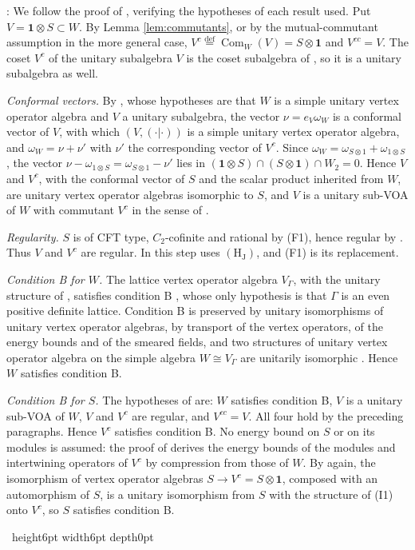 \documentclass[leqno]{article}
\newcommand{\qed}{\hfill \vrule height6pt  width6pt depth0pt}
\newcommand{\ot}{\otimes}
\newcommand{\ov}{\overset}
\newenvironment{proof}[1][]{\noindent {\it Proof #1} : }{\hbox{~}\qed
\smallskip
}
\numberwithin{equation}{section}
\begin{document}
\begin{proof}
We follow the proof of \cite[Theorem 7.17]{ArhII}, verifying the hypotheses of each result used. Put $V = \mathbf 1 \ot S \subset W$. By Lemma \ref{lem:commutants}, or by the mutual-commutant assumption in the more general case, $V^c \ov{\mathrm{def}}{=} \operatorname{Com}_W(V) = S \ot \mathbf 1$ and $V^{cc} = V$. The coset $V^c$ of the unitary subalgebra $V$ is the coset subalgebra of \cite[Example 5.27 p.~44]{CKLW18}, so it is a unitary subalgebra as well.

\emph{Conformal vectors.} By \cite[Propositions 5.29 and 5.31 p.~45]{CKLW18}, whose hypotheses are that $W$ is a simple unitary vertex operator algebra and $V$ a unitary subalgebra, the vector $\nu = e_V\omega_W$ is a conformal vector of $V$, with which $(V,(\cdot|\cdot))$ is a simple unitary vertex operator algebra, and $\omega_W = \nu+\nu'$ with $\nu'$ the corresponding vector of $V^c$. Since $\omega_W = \omega_{S \ot 1}+\omega_{1 \ot S}$, the vector $\nu-\omega_{1 \ot S} = \omega_{S \ot 1}-\nu'$ lies in $(\mathbf 1 \ot S) \cap (S \ot \mathbf 1) \cap W_2 = 0$. Hence $V$ and $V^c$, with the conformal vector of $S$ and the scalar product inherited from $W$, are unitary vertex operator algebras isomorphic to $S$, and $V$ is a unitary sub-VOA of $W$ with commutant $V^c$ in the sense of \cite[Section 3.6.1 p.~49]{Gui26}.

\emph{Regularity.} $S$ is of CFT type, $C_2$-cofinite and rational by (F1), hence regular by \cite[Theorem 4.5]{ABD04}. Thus $V$ and $V^c$ are regular. In \cite{ArhII} this step uses $\mathrm{(H_J)}$, and (F1) is its replacement.

\emph{Condition B for $W$.} The lattice vertex operator algebra $V_\Gamma$, with the unitary structure of \cite{DoL14}, satisfies condition B \cite[Theorem 3.46 p.~57]{Gui26}, whose only hypothesis is that $\Gamma$ is an even positive definite lattice. Condition B is preserved by unitary isomorphisms of unitary vertex operator algebras, by transport of the vertex operators, of the energy bounds and of the smeared fields, and two structures of unitary vertex operator algebra on the simple algebra $W \cong V_\Gamma$ are unitarily isomorphic \cite[Proposition 5.19 pp.~40--41]{CKLW18}. Hence $W$ satisfies condition B.

\emph{Condition B for $S$.} The hypotheses of \cite[Theorem 3.34 p.~51]{Gui26} are: $W$ satisfies condition B, $V$ is a unitary sub-VOA of $W$, $V$ and $V^c$ are regular, and $V^{cc} = V$. All four hold by the preceding paragraphs. Hence $V^c$ satisfies condition B. No energy bound on $S$ or on its modules is assumed: the proof of \cite[Theorem 3.34]{Gui26} derives the energy bounds of the modules and intertwining operators of $V^c$ by compression from those of $W$. By \cite[Proposition 5.19]{CKLW18} again, the isomorphism of vertex operator algebras $S \to V^c = S \ot \mathbf 1$, composed with an automorphism of $S$, is a unitary isomorphism from $S$ with the structure of (I1) onto $V^c$, so $S$ satisfies condition B.


\end{proof}
\end{document}
